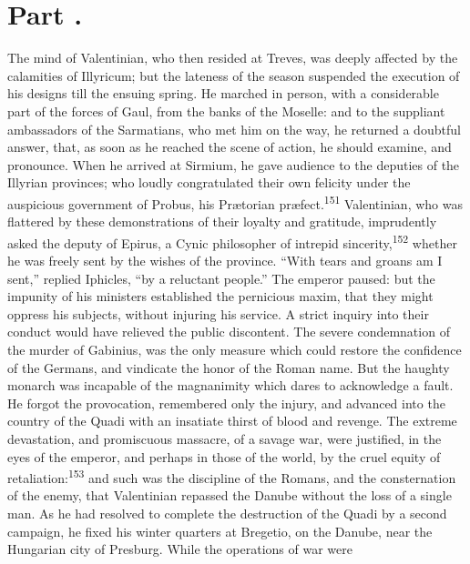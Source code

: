 
\section{Part \thesection.}

The mind of Valentinian, who then resided at Treves, was deeply
affected by the calamities of Illyricum; but the lateness of the
season suspended the execution of his designs till the ensuing
spring. He marched in person, with a considerable part of the
forces of Gaul, from the banks of the Moselle: and to the
suppliant ambassadors of the Sarmatians, who met him on the way,
he returned a doubtful answer, that, as soon as he reached the
scene of action, he should examine, and pronounce. When he
arrived at Sirmium, he gave audience to the deputies of the
Illyrian provinces; who loudly congratulated their own felicity
under the auspicious government of Probus, his Prætorian præfect.\textsuperscript{151}
Valentinian, who was flattered by these demonstrations of
their loyalty and gratitude, imprudently asked the deputy of
Epirus, a Cynic philosopher of intrepid sincerity,\textsuperscript{152} whether he
was freely sent by the wishes of the province. “With tears and
groans am I sent,” replied Iphicles, “by a reluctant people.” The
emperor paused: but the impunity of his ministers established the
pernicious maxim, that they might oppress his subjects, without
injuring his service. A strict inquiry into their conduct would
have relieved the public discontent. The severe condemnation of
the murder of Gabinius, was the only measure which could restore
the confidence of the Germans, and vindicate the honor of the
Roman name. But the haughty monarch was incapable of the
magnanimity which dares to acknowledge a fault. He forgot the
provocation, remembered only the injury, and advanced into the
country of the Quadi with an insatiate thirst of blood and
revenge. The extreme devastation, and promiscuous massacre, of a
savage war, were justified, in the eyes of the emperor, and
perhaps in those of the world, by the cruel equity of
retaliation:\textsuperscript{153} and such was the discipline of the Romans, and
the consternation of the enemy, that Valentinian repassed the
Danube without the loss of a single man. As he had resolved to
complete the destruction of the Quadi by a second campaign, he
fixed his winter quarters at Bregetio, on the Danube, near the
Hungarian city of Presburg. While the operations of war were
